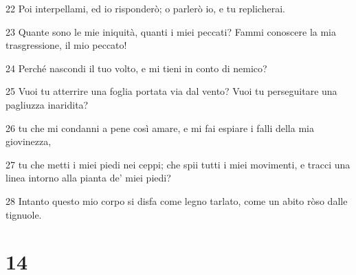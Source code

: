\par 22 Poi interpellami, ed io risponderò; o parlerò io, e tu replicherai.
\par 23 Quante sono le mie iniquità, quanti i miei peccati? Fammi conoscere la mia trasgressione, il mio peccato!
\par 24 Perché nascondi il tuo volto, e mi tieni in conto di nemico?
\par 25 Vuoi tu atterrire una foglia portata via dal vento? Vuoi tu perseguitare una pagliuzza inaridita?
\par 26 tu che mi condanni a pene così amare, e mi fai espiare i falli della mia giovinezza,
\par 27 tu che metti i miei piedi nei ceppi; che spii tutti i miei movimenti, e tracci una linea intorno alla pianta de' miei piedi?
\par 28 Intanto questo mio corpo si disfa come legno tarlato, come un abito ròso dalle tignuole.

\chapter{14}

